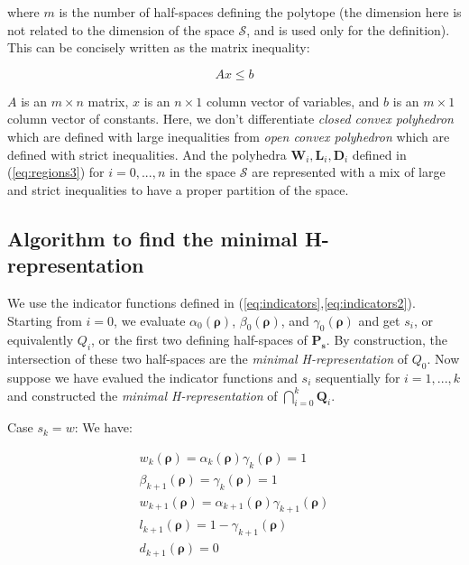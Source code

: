 \noindent where $m$ is the number of half-spaces defining the polytope (the dimension here is not related to the dimension of the space $\mathcal{S}$, and is used only for the definition). This can be concisely written as the matrix inequality:

\begin{equation}
Ax \leq b
\label{eq:matRepresentation}
\end{equation}

\noindent $A$ is an $m\times n$ matrix, $x$ is an $n\times 1$ column vector of variables, and $b$ is an $m\times 1$ column vector of constants. Here, we don't differentiate \textit{closed convex polyhedron} which are defined with large inequalities from \textit{open convex polyhedron} which are defined with strict inequalities. And the polyhedra $\textbf{W}_{i}, \textbf{L}_{i}, \textbf{D}_{i}$ defined in (\ref{eq:regions3}) for $i=0,...,n$ in the space $\mathcal{S}$ are represented with a mix of large and strict inequalities to have a proper partition of the space.


\subsection{Algorithm to find the minimal H-representation}\label{sec:minHrepresentation}

We use the indicator functions defined in (\ref{eq:indicators},\ref{eq:indicators2}). Starting from $i=0$, we evaluate $\alpha_{0}(\boldsymbol\rho)$, $\beta_{0}(\boldsymbol\rho)$, and $\gamma_{0}(\boldsymbol\rho)$ and get $s_{i}$, or equivalently $Q_{i}$, or the first two defining half-spaces of $\textbf{P}_{\boldsymbol s}$. By construction, the intersection of these two half-spaces are the \textit{minimal H-representation} of $Q_{0}$. Now suppose we have evalued the indicator functions and $s_{i}$ sequentially for $i=1,...,k$ and constructed the \textit{minimal H-representation} of $\bigcap_{i=0}^{k} \textbf{Q}_{i}$.

Case $s_{k}=w$: We have:

\begin{equation}
\begin{array}{l}
w_{k}(\boldsymbol\rho)=\alpha_{k}(\boldsymbol\rho)\gamma_{k}(\boldsymbol\rho)=1\\
\beta_{k+1}(\boldsymbol\rho)=\gamma_{k}(\boldsymbol\rho)=1\\
w_{k+1}(\boldsymbol\rho)=\alpha_{k+1}(\boldsymbol\rho)\gamma_{k+1}(\boldsymbol\rho)\\
l_{k+1}(\boldsymbol\rho)=1-\gamma_{k+1}(\boldsymbol\rho)\\
d_{k+1}(\boldsymbol\rho)=0
\end{array}
\end{equation}

